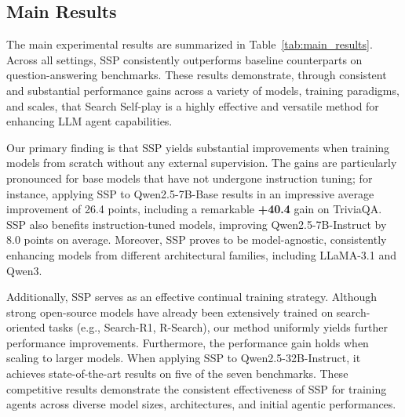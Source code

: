\documentclass[10pt, a4paper, logo]{googledeepmind} %
\begin{document}
\vspace{-2mm}
\subsection{Main Results}
\vspace{-2mm}
The main experimental results are summarized in Table~\ref{tab:main_results}. Across all settings, SSP consistently outperforms baseline counterparts on question-answering benchmarks. These results demonstrate, through consistent and substantial performance gains across a variety of models, training paradigms, and scales, that Search Self-play is a highly effective and versatile method for enhancing LLM agent capabilities.

Our primary finding is that SSP yields substantial improvements when training models from scratch without any external supervision. The gains are particularly pronounced for base models that have not undergone instruction tuning; for instance, applying SSP to Qwen2.5-7B-Base results in an impressive average improvement of 26.4 points, including a remarkable \textbf{+40.4} gain on TriviaQA. SSP also benefits instruction-tuned models, improving Qwen2.5-7B-Instruct by 8.0 points on average. Moreover, SSP proves to be model-agnostic, consistently enhancing models from different architectural families, including LLaMA-3.1 and Qwen3.

Additionally, SSP serves as an effective continual training strategy. Although strong open-source models have already been extensively trained on search-oriented tasks (e.g., Search-R1, R-Search), our method uniformly yields further performance improvements. Furthermore, the performance gain holds when scaling to larger models. When applying SSP to Qwen2.5-32B-Instruct, it achieves state-of-the-art results on five of the seven benchmarks. These competitive results demonstrate the consistent effectiveness of SSP for training agents across diverse model sizes, architectures, and initial agentic performances.
\end{document}
